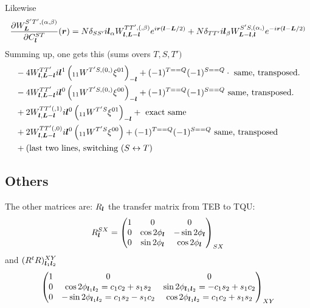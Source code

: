 \documentclass[prd, superscriptaddress, tightenlines, longbibliography, nofootinbib, eqsecnum, amsfonts, amsmath, floatfix, onecolumn, notitlepage]{revtex4-2}
\begin{document}
Likewise
\begin{equation}
		\frac{\partial W_{\boldsymbol{L}}^{S'T', (\alpha, \beta)}}{\partial C_{\boldsymbol{l}}^{ST}}(\boldsymbol{r}) = N\delta_{SS'}i\boldsymbol{l}_\alpha W^{TT', (,\beta)}_{\boldsymbol{l}, \boldsymbol{L}-\boldsymbol{l}}e^{i \boldsymbol{r} \left(\boldsymbol{l} - \boldsymbol{L}/2 \right)} + N \delta_{TT'} i\boldsymbol{l}_\beta W^{S'S, (\alpha,)}_{\boldsymbol{L}-\boldsymbol{l}, \boldsymbol{l}} e^{-i\boldsymbol{r}(\boldsymbol{l} -\boldsymbol{L}/2)}
\end{equation}
Summing up, one gets this (sums overs $T,S, T')$
\begin{equation}
\begin{split}
		&-4 W^{TT'}_{\boldsymbol{l}, \boldsymbol{L} - \boldsymbol{l}} i\boldsymbol{l}^1 \left(_{11}W^{T'S, (0,)} \xi^{01} \right)_{-\boldsymbol{l}} + (-1)^{T==Q}(-1)^{S==Q}\cdot\textrm{ same,  transposed}. \\
		&-4 W^{TT'}_{\boldsymbol{l}, \boldsymbol{L} - \boldsymbol{l}} i\boldsymbol{l}^0 \left(_{11}W^{T'S, (0,)} \xi^{00} \right)_{-\boldsymbol{l}} + (-1)^{T==Q}(-1)^{S==Q}\textrm{ same, transposed}. \\
		&+2 W^{TT'(,1)}_{\boldsymbol{l}, \boldsymbol{L} - \boldsymbol{l}} i \boldsymbol{l}^0 \left( _{11}W^{T'S}\xi^{01}\right)_{-\boldsymbol{l}}  + \textrm{ exact same} \\
		 &+ 2W^{TT'(,0)}_{\boldsymbol{l}, \boldsymbol{L} - \boldsymbol{l}} i \boldsymbol{l}^0 \left( _{11}W^{T'S}\xi^{00} \right)  + (-1)^{T==Q}(-1)^{S==Q}\textrm{ same, transposed}\\
		 &+ (\textrm{last two lines, switching } (S \leftrightarrow T)
\end{split}
\end{equation}
\subsection{Others}
The other matrices are: $R_{\boldsymbol{l}}$ the transfer matrix from TEB to TQU:
\begin{equation} R^{SX}_{\boldsymbol{l}} = 
	\begin{pmatrix}
		1 & 0 & 0 \\ 0 & \cos 2\phi_{\boldsymbol{l}} & -\sin 2\phi_{\boldsymbol{l}} \\ 0 & \sin 2\phi_{\boldsymbol{l}} & \cos 2\phi_{\boldsymbol{l}}
	\end{pmatrix}_{SX}
\end{equation}
and $(R^tR)^{XY}_{\boldsymbol{l}_1\boldsymbol{l}_2}$
\begin{equation}
		\begin{pmatrix}
		1 & 0 & 0 \\ 0 & \cos 2\phi_{\boldsymbol{l}_1\boldsymbol{l}_2}= c_1c_2 + s_1 s_2 & \sin 2\phi_{\boldsymbol{l}_1\boldsymbol{l}_2}= -c_1s_2 + s_1 c_2 \\ 0 & -\sin 2\phi_{\boldsymbol{l}_1\boldsymbol{l}_2}= c_1s_2 - s_1 c_2 & \cos 2\phi_{\boldsymbol{l}_1\boldsymbol{l}_2}= c_1c_2 + s_1 s_2
	\end{pmatrix}_{XY}
\end{equation}
\end{document}

